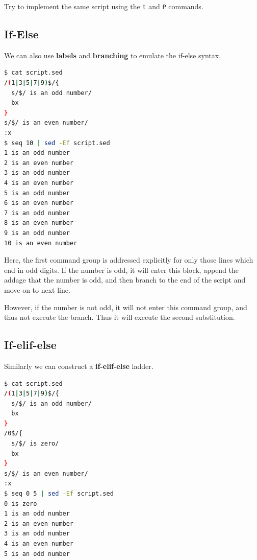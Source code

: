 \begin{exercise}
  Try to implement the same script using the \lstinline|t| and \lstinline|P| commands.
\end{exercise}

\subsection{If-Else}

We can also use \textbf{labels} and \textbf{branching} to emulate the if-else syntax.

\begin{lstlisting}[language=bash]
$ cat script.sed
/(1|3|5|7|9)$/{
  s/$/ is an odd number/
  bx
}
s/$/ is an even number/
:x
$ seq 10 | sed -Ef script.sed
1 is an odd number
2 is an even number
3 is an odd number
4 is an even number
5 is an odd number
6 is an even number
7 is an odd number
8 is an even number
9 is an odd number
10 is an even number
\end{lstlisting}

Here, the first command group is addressed explicitly for only those lines which end in odd digits. If the number is odd, it will enter this block, append the addage that the number is odd, and then branch to the end of the script and move on to next line.

However, if the number is not odd, it will not enter this command group, and thus not execute the branch. Thus it will execute the second substitution.

\subsection{If-elif-else}

Similarly we can construct a \textbf{if-elif-else} ladder.

\begin{lstlisting}[language=bash]
$ cat script.sed
/(1|3|5|7|9)$/{
  s/$/ is an odd number/
  bx
}
/0$/{
  s/$/ is zero/
  bx
}
s/$/ is an even number/
:x
$ seq 0 5 | sed -Ef script.sed
0 is zero
1 is an odd number
2 is an even number
3 is an odd number
4 is an even number
5 is an odd number
\end{lstlisting}
